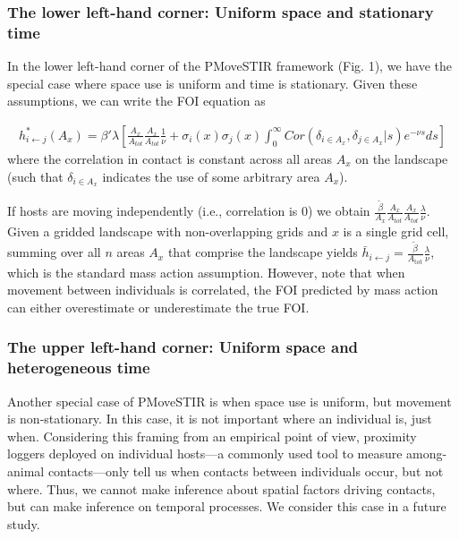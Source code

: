 \documentclass[letterpaper]{article}
\begin{document}
\subsubsection*{The lower left-hand corner: Uniform space and stationary time}

In the lower left-hand corner of the PMoveSTIR framework (Fig. 1), we have the special case where space use is uniform and time is stationary. Given these assumptions, we can write the FOI equation as

\begin{equation}
    \begin{aligned}
        h^*_{i \leftarrow j}(A_x) = \beta' \lambda \left[\frac{A_x}{A_{tot}}\frac{A_x}{A_{tot}} \frac{1}{\nu} + \sigma_i(x) \sigma_j(x) \int_{0}^{\infty} Cor(\delta_{i \in A_x}, \delta_{j \in A_x} | s) e^{-\nu s} ds\right]
    \end{aligned}
    \label{eq:uniform_stationary1}
\end{equation}
where the correlation in contact is constant across all areas $A_x$ on the landscape (such that $\delta_{i \in A_x}$ indicates the use of some arbitrary area $A_x$).  

If hosts are moving independently (i.e., correlation is 0) we obtain $\frac{\tilde{\beta}}{A_x} \frac{A_x}{A_{tot}} \frac{A_x}{A_{tot}}  \frac{\lambda}{\nu}$. Given a gridded landscape with non-overlapping grids and $x$ is a single grid cell, summing over all $n$ areas $A_x$ that comprise the landscape yields $\bar{h}_{i \leftarrow j} =\frac{\tilde{\beta}}{A_\text{tot}} \frac{\lambda}{\nu}$, which is the standard mass action assumption.  However, note that when movement between individuals is correlated, the FOI predicted by mass action can either overestimate or underestimate the true FOI. 


\subsubsection*{The upper left-hand corner: Uniform space and heterogeneous time}

Another special case of PMoveSTIR is when space use is uniform, but movement is non-stationary.  In this case, it is not important where an individual is, just when. Considering this framing from an empirical point of view, proximity loggers deployed on individual hosts---a commonly used tool to measure among-animal contacts---only tell us when contacts between individuals occur, but not where.  Thus, we cannot make inference about spatial factors driving contacts, but can make inference on temporal processes.  We consider this case in a future study.
\end{document}
